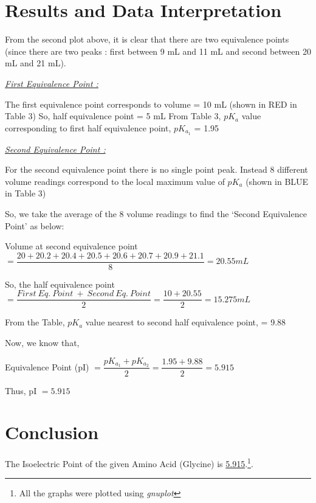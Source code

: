 \documentclass[12pt]{article}
\begin{document}
	\section{Results and Data Interpretation}
	
	From the second plot above, it is clear that there are two equivalence points (since
	there are two peaks : first between 9 mL and 11 mL and second between 20 mL and 21
	mL).
	
	\emph{\underline{First Equivalence Point :}}
	
	The first equivalence point corresponds to volume = 10 mL {\color{red}(shown in RED in
	Table 3)}
	So, half equivalence point = 5 mL
	From Table 3, $pK_{a}$ value corresponding to first half equivalence point, $pK_{a_{1}}$ = 1.95
	
	\emph{\underline{Second Equivalence Point :}}
	
	For the second equivalence point there is no single point peak. Instead 8 different
	volume readings correspond to the local maximum value of $pK_{a}$ {(\color{blue}shown in BLUE
	in Table 3)}
	
	So, we take the average of the 8 volume readings to find the ‘Second Equivalence
	Point’ as below:
	
	Volume at second equivalence point $= \dfrac{20+20.2+20.4+20.5+20.6+20.7+20.9+21.1}{8} = 20.55 mL$
	
	So, the half equivalence point $= \dfrac{First\ Eq.\ Point\ +\ Second\ Eq.\ Point}{2} = \dfrac{10+20.55}{2} = 15.275 mL$
	
	From the Table, $pK_{a}$ value nearest to second half equivalence point, = 9.88
	
	Now, we know that,
	
	Equivalence Point (pI) $= \dfrac{pK_{a_{1}} + pK_{a_{2}}}{2} = \dfrac{1.95 + 9.88}{2} = 5.915$
	
	Thus, pI $= 5.915$
	
	\section{Conclusion}
	
	The Isoelectric Point of the given Amino Acid (Glycine) is \underline{5.915}.\footnote{All the graphs were plotted using \emph{gnuplot}}.
\end{document}
